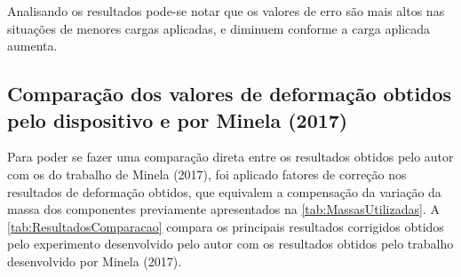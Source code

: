 \begin{table}[H]
    \caption{Resultados de deformação obtidos}
    \label{tab:ResultadosDeformacao}
    \centering
\end{table}

Analisando os resultados pode-se notar que os valores de erro são mais altos nas situações de menores cargas aplicadas, e diminuem conforme a carga aplicada aumenta.

\subsection{Comparação dos valores de deformação obtidos pelo dispositivo e por Minela (2017)}

Para poder se fazer uma comparação direta entre os resultados obtidos pelo autor com os do trabalho de Minela (2017), foi aplicado fatores de correção nos resultados de deformação
obtidos, que equivalem a compensação da variação da massa dos componentes previamente apresentados na \autoref{tab:MassasUtilizadas}.
A \autoref{tab:ResultadosComparacao} compara os principais resultados corrigidos obtidos pelo experimento desenvolvido pelo autor com os resultados obtidos pelo trabalho desenvolvido por Minela (2017).

